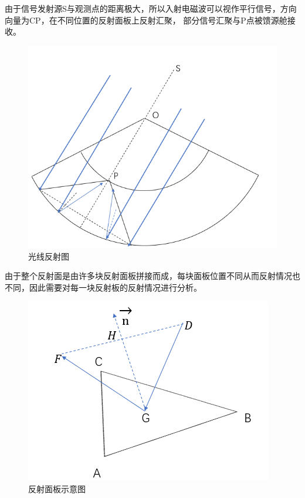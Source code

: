 \documentclass[withoutpreface,bwprint]{cumcmthesis} %
\begin{document}
由于信号发射源S与观测点的距离极大，所以入射电磁波可以视作平行信号，方向向量为CP，在不同位置的反射面板上反射汇聚，
部分信号汇聚与P点被馈源舱接收。

\begin{figure}[H]
    \centering
    \includegraphics[scale=0.3]{images/fanshe.png}
    \caption{光线反射图}
\end{figure}


由于整个反射面是由许多块反射面板拼接而成，每块面板位置不同从而反射情况也不同，因此需要对每一块反射板的反射情况进行分析。


\begin{figure}[H]
    \centering
    \includegraphics[scale=0.3]{images/ban.png}
    \caption{反射面板示意图}
\end{figure}
\end{document}
